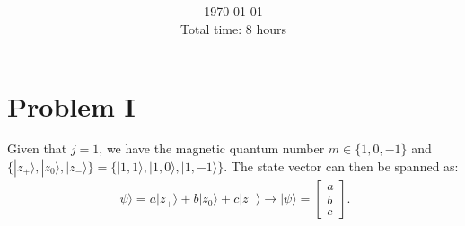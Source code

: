 \documentclass[letterpaper,11pt,twoside]{article}
\title{\textbf{\assignment}\\\course\\{\Large\institution}}
\author{\autor}
\date{\today\\Total time: 8 hours}
\newcommand{\ket}[1]{|#1\rangle}
\begin{document}
\pagestyle{mainstyle}
\maketitle
\section*{Problem I}
Given that $j=1$, we have the magnetic quantum number $m\in\{1,0,-1\}$ and $\{\ket{z_+},\ket{z_0},\ket{z_-}\}=\{\ket{1,1},\ket{1,0},\ket{1,-1}\}$.
The state vector can then be spanned as:
\begin{align*}
  \ket{\psi}=a\ket{z_+}+b\ket{z_0}+c\ket{z_-}\longrightarrow\ket{\psi}=\begin{bmatrix}
    a\\b\\c
  \end{bmatrix}.
\end{align*}
\end{document}
